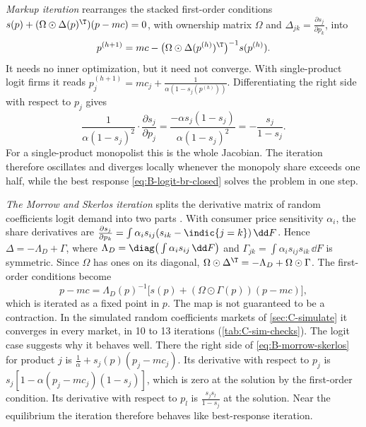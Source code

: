 \emph{Markup iteration} rearranges the stacked first-order conditions $s(p) + (\Omega \odot
\Delta(p)^\T)(p - mc) = 0$, with ownership matrix $\Omega$ and $\Delta_{jk} = \frac{\partial s_j}{\partial
p_k}$, into
\begin{equation}\label{eq:B-markup-iteration}
  p^{(h+1)} = mc - \big(\Omega \odot \Delta(p^{(h)})^\T\big)^{-1}s(p^{(h)}).
\end{equation}
It needs no inner optimization, but it need not converge. With single-product logit firms it reads $p^{(h+1)}_j
= mc_j + \frac{1}{\alpha(1 - s_j(p^{(h)}))}$. Differentiating the right side with respect to $p_j$ gives
\begin{equation*}
  \frac{1}{\alpha(1 - s_j)^2}\cdot\frac{\partial s_j}{\partial p_j} = \frac{-\alpha s_j(1 - s_j)}{\alpha(1 -
  s_j)^2} = -\frac{s_j}{1 - s_j}.
\end{equation*}
For a single-product monopolist this is the whole Jacobian. The iteration therefore oscillates and diverges
locally whenever the monopoly share exceeds one half, while the best response \eqref{eq:B-logit-br-closed} solves the
problem in one step.

\emph{The Morrow and Skerlos iteration} splits the derivative matrix of random coefficients logit demand
into two parts \citep{MorrowSkerlos2011}. With consumer price sensitivity $\alpha_i$, the share derivatives
are $\frac{\partial s_j}{\partial p_k} = \int\alpha_is_{ij}(s_{ik} - \indic\{j = k\})\,\dd F$. Hence $\Delta =
-\Lambda_D + \Gamma$, where $\Lambda_D = \diag\big(\int\alpha_is_{ij}\,\dd F\big)$ and $\Gamma_{jk} =
\int\alpha_is_{ij}s_{ik}\,\dd F$ is symmetric. Since $\Omega$ has ones on its diagonal, $\Omega \odot \Delta^\T =
-\Lambda_D + \Omega \odot \Gamma$. The first-order conditions become
\begin{equation}\label{eq:B-morrow-skerlos}
  p - mc = \Lambda_D(p)^{-1}\big[s(p) + (\Omega \odot \Gamma(p))(p - mc)\big],
\end{equation}
which is iterated as a fixed point in $p$. The map is not guaranteed to be a contraction. In the simulated random
coefficients markets of \cref{sec:C-simulate} it converges in every market, in 10 to 13 iterations
(\cref{tab:C-sim-checks}). The logit case suggests why it behaves well.
There the right side of \eqref{eq:B-morrow-skerlos} for product $j$ is $\frac{1}{\alpha} + s_j(p)(p_j - mc_j)$.
Its derivative with respect to $p_j$ is $s_j[1 - \alpha(p_j - mc_j)(1 - s_j)]$, which is zero at the solution by
the first-order condition. Its derivative with respect to $p_l$ is $\frac{s_js_l}{1 - s_j}$ at the solution.
Near the equilibrium the iteration therefore behaves like best-response iteration.

